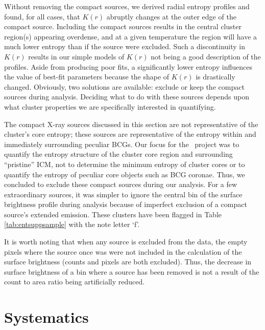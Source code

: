 Without removing the compact sources, we derived radial entropy
profiles and found, for all cases, that $K(r)$ abruptly changes at the
outer edge of the compact source. Including the compact sources
results in the central cluster region(s) appearing overdense, and at a
given temperature the region will have a much lower entropy than if
the source were excluded. Such a discontinuity in $K(r)$ results in
our simple models of $K(r)$ not being a good description of the
profiles. Aside from producing poor fits, a significantly lower
entropy influences the value of best-fit parameters because the shape
of $K(r)$ is drastically changed. Obviously, two solutions are
available: exclude or keep the compact sources during analysis.
Deciding what to do with these sources depends upon what cluster
properties we are specifically interested in quantifying.

The compact X-ray sources discussed in this section are not
representative of the cluster's core entropy; these sources are
representative of the entropy within and immediately surrounding
peculiar BCGs. Our focus for the \accept\ project was to quantify the
entropy structure of the cluster core region and surrounding
``pristine'' ICM, not to determine the minimum entropy of cluster
cores or to quantify the entropy of peculiar core objects such as BCG
coronae. Thus, we concluded to exclude these compact sources during
our analysis. For a few extraordinary sources, it was simpler to
ignore the central bin of the surface brightness profile during
analysis because of imperfect exclusion of a compact source's extended
emission. These clusters have been flagged in Table
\ref{tab:entsuppsample} with the note letter `f'.

It is worth noting that when any source is excluded from the data, the
empty pixels where the source once was were not included in the
calculation of the surface brightness (counts and pixels are both
excluded). Thus, the decrease in surface brightness of a bin where a
source has been removed is not a result of the count to area ratio
being artificially reduced.

\section{Systematics}
\label{sec:entsuppsys}

